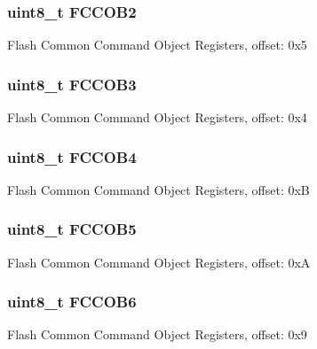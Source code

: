 \subsubsection[{F\+C\+C\+O\+B2}]{\setlength{\rightskip}{0pt plus 5cm}uint8\+\_\+t F\+C\+C\+O\+B2}\label{struct_f_t_f_a___mem_map_aa5ad7d9940c2583b953391dfd3d2ba29}
Flash Common Command Object Registers, offset\+: 0x5 \hypertarget{struct_f_t_f_a___mem_map_a118d8bb5338384802341a3c1c0b83695}{}
\subsubsection[{F\+C\+C\+O\+B3}]{\setlength{\rightskip}{0pt plus 5cm}uint8\+\_\+t F\+C\+C\+O\+B3}\label{struct_f_t_f_a___mem_map_a118d8bb5338384802341a3c1c0b83695}
Flash Common Command Object Registers, offset\+: 0x4 \hypertarget{struct_f_t_f_a___mem_map_a4bbf55765b68c8e0b2a60d4ed272ad44}{}
\subsubsection[{F\+C\+C\+O\+B4}]{\setlength{\rightskip}{0pt plus 5cm}uint8\+\_\+t F\+C\+C\+O\+B4}\label{struct_f_t_f_a___mem_map_a4bbf55765b68c8e0b2a60d4ed272ad44}
Flash Common Command Object Registers, offset\+: 0x\+B \hypertarget{struct_f_t_f_a___mem_map_af5870cd3bcb5d883764ea82b8e603a85}{}
\subsubsection[{F\+C\+C\+O\+B5}]{\setlength{\rightskip}{0pt plus 5cm}uint8\+\_\+t F\+C\+C\+O\+B5}\label{struct_f_t_f_a___mem_map_af5870cd3bcb5d883764ea82b8e603a85}
Flash Common Command Object Registers, offset\+: 0x\+A \hypertarget{struct_f_t_f_a___mem_map_a3a9b609e4e8d8a712e4f6c735213ba83}{}
\subsubsection[{F\+C\+C\+O\+B6}]{\setlength{\rightskip}{0pt plus 5cm}uint8\+\_\+t F\+C\+C\+O\+B6}\label{struct_f_t_f_a___mem_map_a3a9b609e4e8d8a712e4f6c735213ba83}
Flash Common Command Object Registers, offset\+: 0x9 \hypertarget{struct_f_t_f_a___mem_map_aed0c64fe289bde02ca6493b1be2f4154}{}
